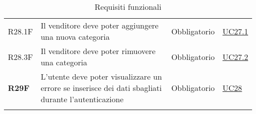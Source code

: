 \begin{center}
\begin{longtable}[!h]{p{50px} p{245px} p{75px} p{50px}}
        R28.1F                                & Il venditore deve poter aggiungere una nuova categoria                                                     & Obbligatorio             & \hyperref[sec:UC27.1]{UC27.1}                \\
        R28.3F                                & Il venditore deve poter rimuovere una categoria                                                            & Obbligatorio             & \hyperref[sec:UC27.2]{UC27.2}                \\
        \textbf{R29F}                         & L'utente deve poter visualizzare un errore se inserisce dei dati sbagliati durante l'autenticazione        & Obbligatorio             & \hyperref[sec:UC28]{UC28}                    \\
        \rowcolor{white}\caption{Requisiti funzionali}                                                                                                                                                                               \\
    \end{longtable}
\end{center}

\newpage
